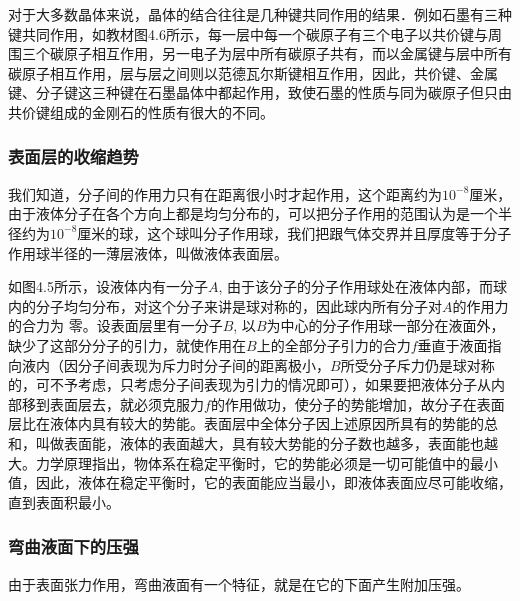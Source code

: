 对于大多数晶体来说，晶体的结合往往是几种键共同作用的结果．例如石墨有三种键共同作用，如教材图4.6所示，每一层中每一个碳原子有三个电子以共价键与周围三个碳原子相互作用，另一电子为层中所有碳原子共有，而以金属键与层中所有碳原子相互作用，层与层之间则以范德瓦尔斯键相互作用，因此，共价键、金属键、分子键这三种键在石墨晶体中都起作用，致使石墨的性质与同为碳原子但只由共价键组成的金刚石的性质有很大的不同。

\subsubsection{表面层的收缩趋势}
我们知道，分子间的作用力只有在距离很小时才起作用，这个距离约为$10^{-8}$厘米，由于液体分子在各个方向上都是均匀分布的，可以把分子作用的范围认为是一个半径约为$10^{-8}$厘米的球，这个球叫分子作用球，我们把跟气体交界并且厚度等于分子作用球半径的一薄层液体，叫做液体表面层。
\begin{figure}[htp]
    \centering
    \caption{}
\end{figure}

如图4.5所示，设液体内有一分子$A$, 由于该分子的分子作用球处在液体内部，而球内的分子均匀分布，对这个分子来讲是球对称的，因此球内所有分子对$A$的作用力的合力为
零。设表面层里有一分子$B$, 以$B$为中心的分子作用球一部分在液面外，缺少了这部分分子的引力，就使作用在$B$上的全部分子引力的合力$f$垂直于液面指向液内（因分子间表现为斥力时分子间的距离极小，$B$所受分子斥力仍是球对称的，可不予考虑，只考虑分子间表现为引力的情况即可），如果要把液体分子从内部移到表面层去，就必须克服力$f$的作用做功，使分子的势能增加，故分子在表面层比在液体内具有较大的势能。表面层中全体分子因上述原因所具有的势能的总和，叫做表面能，液体的表面越大，具有较大势能的分子数也越多，表面能也越大。力学原理指出，物体系在稳定平衡时，它的势能必须是一切可能值中的最小值，因此，液体在稳定平衡时，它的表面能应当最小，即液体表面应尽可能收缩，直到表面积最小。

\subsubsection{弯曲液面下的压强}

由于表面张力作用，弯曲液面有一个特征，就是在它的下面产生附加压强。
\begin{figure}[htp]
    \centering
    \caption{}
\end{figure}

